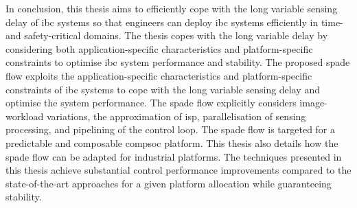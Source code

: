 In conclusion, this thesis aims to efficiently cope with the long variable sensing delay of \gls{ibc} systems so that engineers can deploy \gls{ibc} systems efficiently in time- and safety-critical domains. The thesis copes with the long variable delay by considering both application-specific characteristics and platform-specific constraints to optimise \gls{ibc} system performance and stability. 
The proposed \gls{spade} flow exploits the application-specific characteristics and platform-specific constraints of \gls{ibc} systems to cope with the long variable sensing delay and optimise the system performance. The \gls{spade} flow explicitly considers image-workload variations, the approximation of \gls{isp}, parallelisation of sensing processing, and pipelining of the control loop.
The \gls{spade} flow is targeted for a predictable and composable \gls{compsoc} platform. This thesis also details how the \gls{spade} flow can be adapted for industrial platforms.
The techniques presented in this thesis achieve substantial control performance improvements compared to the state-of-the-art approaches for a given platform allocation while guaranteeing stability.
